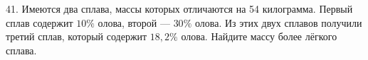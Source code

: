 41. Имеются два сплава, массы которых отличаются на 54 килограмма. Первый сплав содержит $10\%$ олова, второй --- $30\%$ олова. Из этих двух сплавов получили третий сплав, который содержит $18,2\%$ олова. Найдите массу более лёгкого сплава.\\
